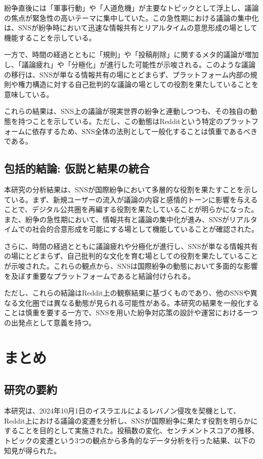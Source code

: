 \documentclass[11pt, a4j]{jreport}
\begin{document}
    紛争直後には「軍事行動」や「人道危機」が主要なトピックとして浮上し、議論の焦点が緊急性の高いテーマに集中していた。この急性期における議論の集中化は、SNSが紛争時において迅速な情報共有とリアルタイムの意思形成の場として機能することを示している。
    
    一方で、時間の経過とともに「規則」や「投稿削除」に関するメタ的議論が増加し、「議論疲れ」や「分極化」\citep{sunstein2001republic}が進行した可能性が示唆される。このような議論の移行は、SNSが単なる情報共有の場にとどまらず、プラットフォーム内部の規則や権力構造に対する自己批判的な議論の場としての役割を果たしていることを意味している\citep{habermas1991structural}。

    これらの結果は、SNS上の議論が現実世界の紛争と連動しつつも、その独自の動態を持つことを示している。ただし、この動態はRedditという特定のプラットフォームに依存するため、SNS全体の法則として一般化することは慎重であるべきである\citep{pariser2011filter}。

    \section{包括的結論: 仮説と結果の統合}
    本研究の分析結果は、SNSが国際紛争において多層的な役割を果たすことを示している。まず、新規ユーザーの流入が議論の内容と感情的トーンに影響を与えることで、デジタル公共圏を再編する役割を果たしていることが明らかになった。また、紛争の急性期において、情報共有と議論の集中化が進み、SNSがリアルタイムでの社会的合意形成を可能にする場として機能していることが確認された。
    
    さらに、時間の経過とともに議論疲れや分極化が進行し、SNSが単なる情報共有の場にとどまらず、自己批判的な文化を育む場としての役割を果たしていることが示唆された。これらの観点から、SNSは国際紛争の動態において多面的な影響を及ぼす重要なプラットフォームであると結論付けられる。

    ただし、これらの結論はReddit上の観察結果に基づくものであり、他のSNSや異なる文化圏では異なる動態が見られる可能性がある。本研究の結果を一般化することは慎重を要する一方で、SNSを用いた紛争対応策の設計や運営における一つの出発点として意義を持つ。

    \chapter{まとめ}
    
    \section{研究の要約}
    本研究は、2024年10月1日のイスラエルによるレバノン侵攻を契機として、Reddit上における議論の変遷を分析し、SNSが国際紛争に果たす役割を明らかにすることを目的として実施された。投稿数の変化、センチメントスコアの推移、トピックの変遷という3つの観点から多角的なデータ分析を行った結果、以下の知見が得られた。
    
\end{document}
